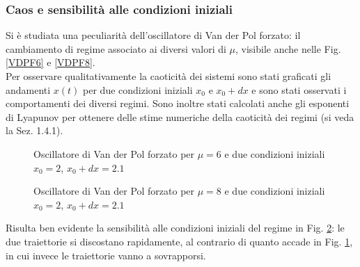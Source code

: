 \documentclass[12pt]{article}
\begin{document}
\subsubsection{Caos e sensibilità alle condizioni iniziali}
Si è studiata una peculiarità dell'oscillatore di Van der Pol forzato: il cambiamento di regime associato ai diversi valori di $\mu$, visibile anche nelle Fig. \ref{VDPF6} e \ref{VDPF8}. \\
Per osservare qualitativamente la caoticità dei sistemi sono stati graficati gli andamenti $x(t)$ per due condizioni iniziali $x_0$ e $x_0 + dx$ e sono stati osservati i comportamenti dei diversi regimi.
Sono inoltre stati calcolati anche gli esponenti di Lyapunov per ottenere delle stime numeriche della caoticità dei regimi (si veda la Sez. 1.4.1).
\begin{figure}[H]
	\centering
	
	\caption{Oscillatore di Van der Pol forzato per $\mu = 6$ e due condizioni iniziali $x_0 = 2$, $x_0 + dx = 2.1$}
	\label{VDPF6_CondIniz}
\end{figure}
\begin{figure}[H]
	\centering
	
	\caption{Oscillatore di Van der Pol forzato per $\mu = 8$ e due condizioni iniziali $x_0 = 2$, $x_0 + dx = 2.1$}
	\label{VDPF8_CondIniz}
\end{figure}
Risulta ben evidente la sensibilità alle condizioni iniziali del regime in Fig. \ref{VDPF8_CondIniz}: le due traiettorie si discostano rapidamente, al contrario di quanto accade in Fig. \ref{VDPF6_CondIniz}, in cui invece le traiettorie vanno a sovrapporsi.
\end{document}
